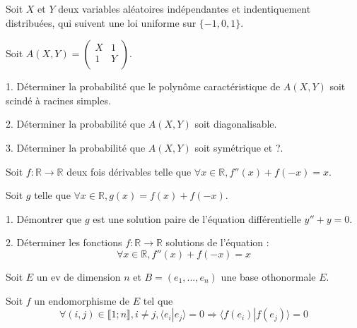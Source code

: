\noindent Soit $X$ et $Y$ deux variables aléatoires indépendantes et indentiquement distribuées, qui suivent
une loi uniforme sur $\{-1, 0, 1\}$.

\noindent Soit $A(X, Y) = 
\begin{pmatrix}
X & 1 \\
1 & Y \\
\end{pmatrix}
$.

\vspace{5pt}
1. Déterminer la probabilité que le polynôme caractéristique de $A(X,Y)$ soit scindé à racines simples.

\vspace{5pt}
2. Déterminer la probabilité que $A(X, Y)$ soit diagonalisable.

\vspace{5pt}
3. Déterminer la probabilité que $A(X, Y)$ soit symétrique et ?.



\subetoiles
\columnbreak



\noindent Soit $f : \mathbb{R} \rightarrow \mathbb{R}$ deux fois dérivables telle que
$\forall x \in \mathbb{R}, f''(x) + f(-x) = x$.

\vspace{5pt}
\noindent Soit $g$ telle que $\forall x \in \mathbb{R}, g(x) = f(x) + f(-x)$.

\vspace{5pt}
1. Démontrer que $g$ est une solution paire de l'équation différentielle $y'' + y = 0$.

\vspace{5pt}
2. Déterminer les fonctions $f : \mathbb{R} \rightarrow \mathbb{R}$ solutions de l'équation :
\begin{equation*}
  \forall x \in \mathbb{R}, f''(x) + f(-x) = x
\end{equation*}



\subetoiles



\noindent Soit $E$ un ev de dimension $n$ et $B = (e_1, ..., e_n)$ une base othonormale $E$.

\noindent Soit $f$ un endomorphisme de $E$ tel que
\begin{equation*}
  \forall (i,j) \in \llbracket 1; n \rrbracket, i \ne j, \langle e_i | e_j \rangle = 0 \Rightarrow \langle f(e_i) | f(e_j) \rangle = 0
\end{equation*}

